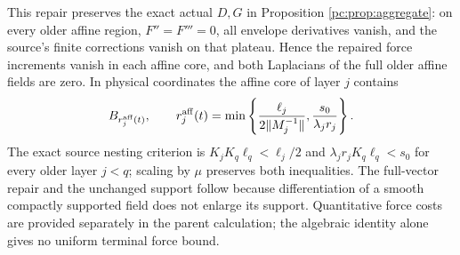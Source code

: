 This repair preserves the exact actual $D,G$ in Proposition \ref{pc:prop:aggregate}: on every older affine region, $F''=F'''=0$, all envelope derivatives vanish, and the source's finite corrections vanish on that plateau. Hence the repaired force increments vanish in each affine core, and both Laplacians of the full older affine fields are zero. In physical coordinates the affine core of layer $j$ contains
\[
 B_{r_j^{\rm aff}(t)},\qquad r_j^{\rm aff}(t)=
 \min\left\{\frac{\ell_j}{2\|M_j^{-1}\|},\frac{s_0}{\lambda_jr_j}\right\}.
\]
The exact source nesting criterion is $K_jK_q\ell_q<\ell_j/2$ and $\lambda_jr_jK_q\ell_q<s_0$ for every older layer $j<q$; scaling by $\mu$ preserves both inequalities. The full-vector repair and the unchanged support follow because differentiation of a smooth compactly supported field does not enlarge its support. Quantitative force costs are provided separately in the parent calculation; the algebraic identity alone gives no uniform terminal force bound.

